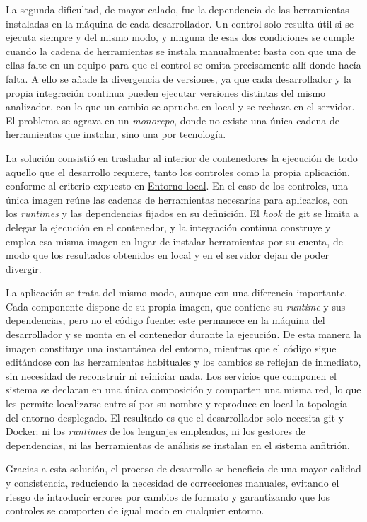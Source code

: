 La segunda dificultad, de mayor calado, fue la dependencia de las herramientas
instaladas en la máquina de cada desarrollador. Un control solo resulta útil si
se ejecuta siempre y del mismo modo, y ninguna de esas dos condiciones se
cumple cuando la cadena de herramientas se instala manualmente: basta con que
una de ellas falte en un equipo para que el control se omita precisamente allí
donde hacía falta. A ello se añade la divergencia de versiones, ya que cada
desarrollador y la propia integración continua pueden ejecutar versiones
distintas del mismo analizador, con lo que un cambio se aprueba en local y se
rechaza en el servidor. El problema se agrava en un \textit{monorepo}, donde no
existe una única cadena de herramientas que instalar, sino una por tecnología.

La solución consistió en trasladar al interior de contenedores la ejecución de
todo aquello que el desarrollo requiere, tanto los controles como la propia
aplicación, conforme al criterio expuesto en
\hyperref[sec:entorno-local]{Entorno local}. En el caso de los controles, una
única imagen reúne las cadenas de herramientas necesarias para aplicarlos, con
los \textit{runtimes} y las dependencias fijados en su definición. El
\textit{hook} de git se limita a delegar la ejecución en el contenedor, y la
integración continua construye y emplea esa misma imagen en lugar de instalar
herramientas por su cuenta, de modo que los resultados obtenidos en local y en
el servidor dejan de poder divergir.

La aplicación se trata del mismo modo, aunque con una diferencia importante.
Cada componente dispone de su propia imagen, que contiene su \textit{runtime} y
sus dependencias, pero no el código fuente: este permanece en la máquina del
desarrollador y se monta en el contenedor durante la ejecución. De esta manera
la imagen constituye una instantánea del entorno, mientras que el código sigue
editándose con las herramientas habituales y los cambios se reflejan de
inmediato, sin necesidad de reconstruir ni reiniciar nada. Los servicios que
componen el sistema se declaran en una única composición y comparten una misma
red, lo que les permite localizarse entre sí por su nombre y reproduce en local
la topología del entorno desplegado. El resultado es que el desarrollador solo
necesita git y Docker: ni los \textit{runtimes} de los
lenguajes empleados, ni los gestores de dependencias, ni las herramientas de
análisis se instalan en el sistema anfitrión.

Gracias a esta solución, el proceso de desarrollo se beneficia de una mayor
calidad y consistencia, reduciendo la necesidad de correcciones manuales,
evitando el riesgo de introducir errores por cambios de formato y garantizando
que los controles se comporten de igual modo en cualquier entorno.
